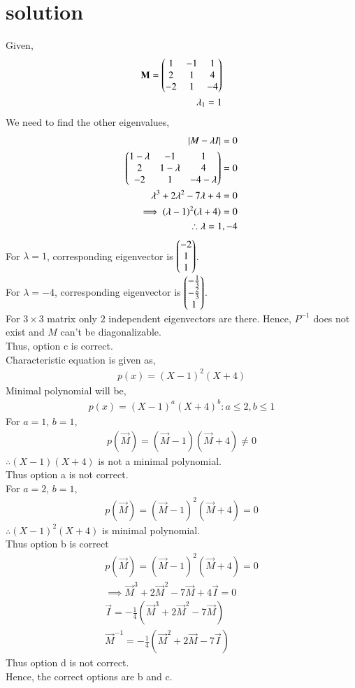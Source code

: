 \documentclass[journal,12pt,twocolumn]{IEEEtran}
\begin{document}
\section{solution}
Given,
\begin{align}
\mathbf{M}=\begin{pmatrix}1&-1&1\\2&1&4\\-2&1&-4\end{pmatrix}\\
\lambda_1=1
\end{align}
We need to find the other eigenvalues,
\begin{align}
\lvert M-\lambda I \rvert =0\\
\begin{pmatrix}1-\lambda&-1 &1\\2&1-\lambda&4\\-2&1&-4-\lambda\end{pmatrix}=0\\
\lambda^3+2\lambda^2-7\lambda+4=0\\
\implies (\lambda-1)^2(\lambda+4)=0\\
\therefore \lambda=1 , -4
\end{align}
For $\lambda=1$, corresponding eigenvector is $\begin{pmatrix}-2\\1\\1\end{pmatrix}$.\\
For $\lambda=-4$, corresponding eigenvector is $\begin{pmatrix}-\frac{1}{3}\\-\frac{2}{3}\\1\end{pmatrix}$.\\
For $3\times3$ matrix only $2$ independent eigenvectors are there. Hence, $P^{-1}$ does not exist and $M$ can't be diagonalizable.\\
Thus, option c is correct.\\
Characteristic equation is given as,
\begin{align}
p(x)=(X-1)^2(X+4)
\end{align}
Minimal polynomial will be,
\begin{align}
p(x)=(X-1)^a(X+4)^b : a \leq 2, b \leq 1
\end{align}
For $a=1$, $b=1$,
\begin{align}
p(\vec{M})=(\vec{M}-1)(\vec{M}+4)\neq0
\end{align}
$\therefore (X-1)(X+4)$ is not a minimal polynomial.\\
Thus option a is not correct.\\
For $a=2$, $b=1$,
\begin{align}
p(\vec{M})=(\vec{M}-1)^2(\vec{M}+4)=0
\end{align}
$\therefore (X-1)^2(X+4)$ is minimal polynomial.\\
Thus option b is correct
\begin{align}
p(\vec{M})=(\vec{M}-1)^2(\vec{M}+4)=0\\
\implies \vec{M}^3+2\vec{M}^2-7\vec{M}+4\vec{I}=0\\
\vec{I}= -\frac{1}{4}(\vec{M}^3+2\vec{M}^2-7\vec{M})\\
\vec{M}^{-1}=-\frac{1}{4}(\vec{M}^2+2\vec{M}-7\vec{I})
\end{align}
Thus option d is not correct.\\
Hence, the correct options are b and c.
\end{document}
